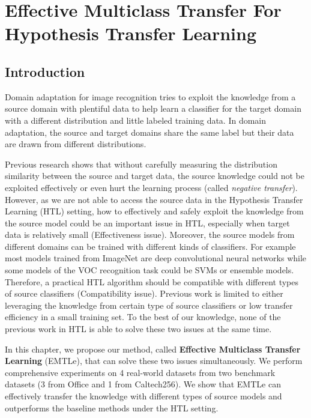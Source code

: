 \chapter{Effective Multiclass Transfer For Hypothesis Transfer Learning}\label{sec:pakdd}
\section{Introduction}
Domain adaptation for image recognition tries to exploit the knowledge from a source domain with plentiful data to help learn a classifier for the target domain with a different distribution and little labeled training data. In domain adaptation, the source and target domains share the same label but their data are drawn from different distributions.

Previous research \cite{ben2010theory,ben2007analysis} shows that without carefully measuring the distribution similarity between the source and target data, the source knowledge could not be exploited effectively or even hurt the learning process (called  \textit{negative transfer})\cite{pan2010survey}. 
However, as we are not able to access the source data in the Hypothesis Transfer Learning (HTL) \cite{kuzborskij2013stability} setting, how to effectively and safely exploit the knowledge from the source model could be an important issue in HTL, especially when target data is relatively small (Effectiveness issue). Moreover, the source models from different domains can be trained with different kinds of classifiers. For example most models trained from ImageNet are deep convolutional neural networks while some models of the VOC recognition task could be SVMs or ensemble models. Therefore, a practical HTL algorithm should be compatible with different types of source classifiers (Compatibility issue). Previous work is limited to either leveraging the knowledge from certain type of source classifiers \cite{tommasi2014learning,fei2006one} or low transfer efficiency in a small training set\cite{jie2011multiclass}. To the best of our knowledge, none of the previous work in HTL is able to solve these two issues at the same time.

In this chapter, we propose our method, called \textbf{Effective Multiclass Transfer Learning} (EMTLe), that can solve these two issues simultaneously. We perform comprehensive experiments on 4 real-world datasets from two benchmark datasets (3 from Office and 1 from Caltech256). We show that EMTLe can effectively transfer the knowledge with different types of source models and outperforms the baseline methods under the HTL setting. 


